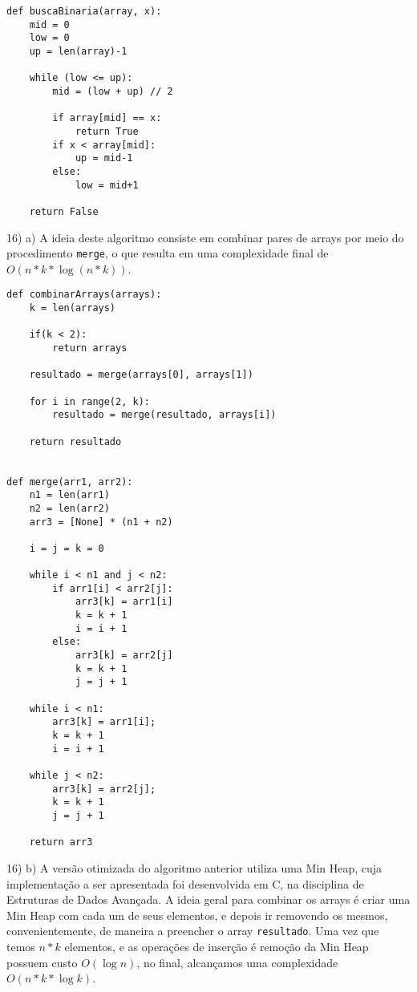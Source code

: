 \documentclass[]{article}
\begin{document}
\vspace{0.5cm}

\begin{lstlisting}
def buscaBinaria(array, x):
    mid = 0
    low = 0
    up = len(array)-1
    
    while (low <= up):
        mid = (low + up) // 2
    
        if array[mid] == x:
            return True
        if x < array[mid]:
            up = mid-1
        else:
            low = mid+1
            
    return False
\end{lstlisting}

\newpage

16) a) A ideia deste algoritmo consiste em combinar pares de arrays por meio do procedimento \texttt{merge}, o que resulta em uma complexidade final de $O(n * k * \log (n * k))$.

\begin{lstlisting}
def combinarArrays(arrays):
    k = len(arrays)
    
    if(k < 2):
        return arrays
    
    resultado = merge(arrays[0], arrays[1])
    
    for i in range(2, k):
        resultado = merge(resultado, arrays[i])
        
    return resultado
    

def merge(arr1, arr2): 
    n1 = len(arr1)
    n2 = len(arr2)
    arr3 = [None] * (n1 + n2)
    
    i = j = k = 0

    while i < n1 and j < n2: 
        if arr1[i] < arr2[j]: 
            arr3[k] = arr1[i] 
            k = k + 1
            i = i + 1
        else: 
            arr3[k] = arr2[j] 
            k = k + 1
            j = j + 1
    
    while i < n1: 
        arr3[k] = arr1[i]; 
        k = k + 1
        i = i + 1

    while j < n2: 
        arr3[k] = arr2[j]; 
        k = k + 1
        j = j + 1
        
    return arr3
\end{lstlisting}

\newpage

16) b) A versão otimizada do algoritmo anterior utiliza uma Min Heap, cuja implementação a ser apresentada foi desenvolvida em C, na disciplina de Estruturas de Dados Avançada. A ideia geral para combinar os arrays é criar uma Min Heap com cada um de seus elementos, e depois ir removendo os mesmos, convenientemente, de maneira a preencher o array \texttt{resultado}. Uma vez que temos $n * k$ elementos, e as operações de inserção é remoção da Min Heap possuem custo $O(\log n)$, no final, alcançamos uma complexidade $O(n * k * \log k)$.
\end{document}
